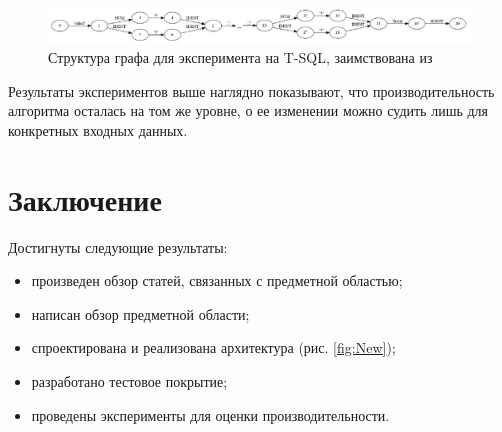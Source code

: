 \documentclass[14pt]{matmex-diploma}
\begin{document}
\begin{figure}[H]
 \includegraphics[width=\textwidth]{images/SQLInput.pdf}
 \caption{Структура графа для эксперимента на T-SQL, заимствована из \cite{graphParseRag}}
 \label{sqlInput}
\end{figure}
Результаты экспериментов выше наглядно показывают, что производительность алгоритма осталась на том же уровне, о ее изменении можно судить лишь для конкретных входных данных.

\newpage
\section{Заключение}
Достигнуты следующие результаты:
\begin{itemize}
    \item произведен обзор статей, связанных с предметной областью;
    \item написан обзор предметной области;
    \item спроектирована и реализована архитектура (рис. \ref{fig:New});
    \item разработано тестовое покрытие;
    \item проведены эксперименты для оценки производительности.
\end{itemize}

\setmonofont[Mapping=tex-text]{CMU Typewriter Text}


\end{document}
